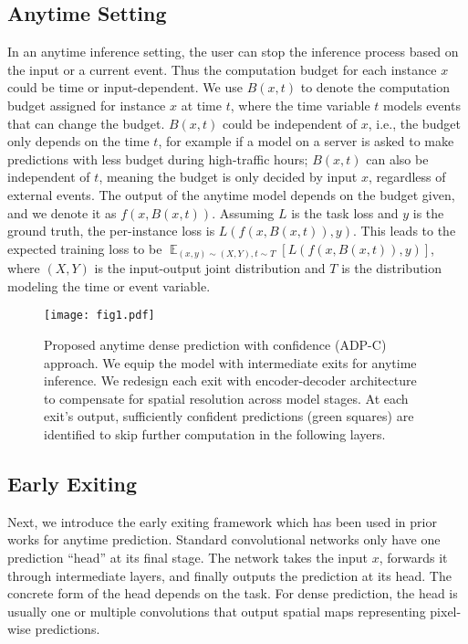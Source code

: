 \subsection{Anytime Setting}
\label{sec:anytime}
In an anytime inference setting, the user can stop the inference process based on the input or a current event.
Thus the computation budget for each instance $x$ could be time or input-dependent.
We use $B(x, t)$ to denote the computation budget assigned for instance $x$ at time $t$, where the time variable $t$ models events that can change the budget.
$B(x, t)$ could be independent of $x$, i.e., the budget only depends on the time $t$, for example if a model on a server is asked to make predictions with less budget during high-traffic hours; $B(x, t)$ can also be independent of $t$, meaning the budget is only decided by input $x$, regardless of external events.
The output of the anytime model depends on the budget given, and we denote it as $f(x, B(x, t))$.
Assuming $L$ is the task loss and $y$ is the ground truth, the per-instance loss is $L(f\left(x, B\left(x, t\right)\right), y)$.
This leads to the expected training loss to be $\mathop{\mathbb{E}}_{(x,y)\sim (X, Y), t\sim T}[L(f\left(x, B\left(x, t\right)\right), y)]$, where $(X, Y)$ is the input-output joint distribution and $T$ is the distribution modeling the time or event variable.

\begin{figure}[t]
\texttt{[image: fig1.pdf]}
\caption{%
Proposed anytime dense prediction with confidence (ADP-C) approach. 
We equip the model with intermediate exits for anytime inference.
We redesign each exit with encoder-decoder architecture to compensate for spatial resolution across model stages.
At each exit's output, sufficiently confident predictions (green squares) are identified to skip further computation in the following layers.
}
\label{fig:fig1}
\end{figure}
\subsection{Early Exiting}
Next, we introduce the early exiting framework which has been used in prior works \cite{huang2017multi,teerapittayanon2016branchynet} for anytime prediction. Standard convolutional networks only have one prediction ``head'' at its final stage.
The network takes the input $x$, forwards it through intermediate layers, and finally outputs the prediction at its head.
The concrete form of the head depends on the task. 
For dense prediction, the head is usually one or multiple convolutions that output spatial maps representing pixel-wise predictions. 

